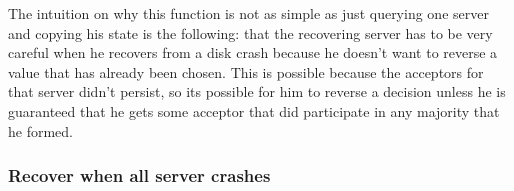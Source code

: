 \documentclass[a4paper]{article}
\begin{document}
The intuition on why this function is not as simple as just querying one server and copying his state is the following: that the recovering server has to be very careful when he recovers from a disk crash because he doesn't want to reverse a value that has already been chosen.
This is possible because the acceptors for that server didn't persist, so its possible for him to reverse a decision unless he is guaranteed that he gets some acceptor that did participate in any majority that he formed.

\subsubsection{Recover when all server crashes}
\end{document}
